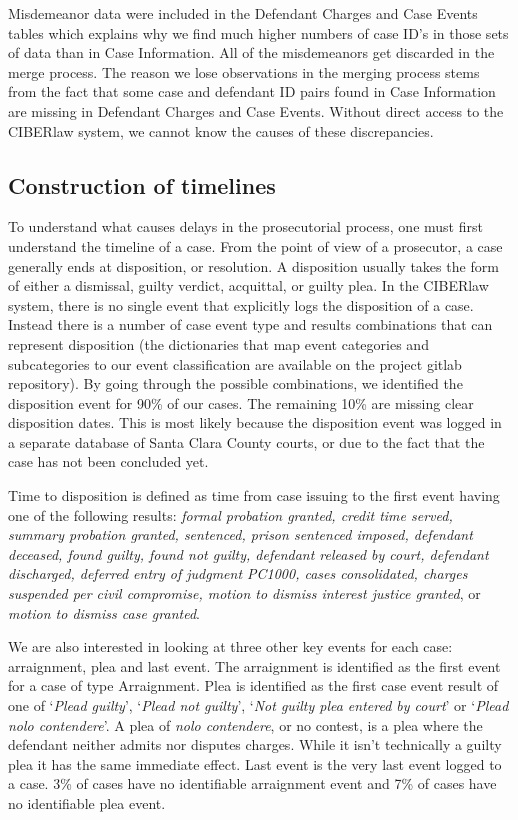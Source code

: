 \documentclass{AISB2008}
\begin{document}
Misdemeanor data were included in the Defendant Charges and Case Events
tables which explains why we find much higher numbers of case ID's in
those sets of data than in Case Information. All of the misdemeanors get
discarded in the merge process. The reason we lose observations in the
merging process stems from the fact that some case and defendant ID
pairs found in Case Information are missing in Defendant Charges and
Case Events. Without direct access to the CIBERlaw system, we cannot
know the causes of these discrepancies.

\subsection{Construction of timelines}\label{construction-of-timelines}

To understand what causes delays in the prosecutorial process, one must
first understand the timeline of a case. From the point of view of a
prosecutor, a case generally ends at disposition, or resolution. A
disposition usually takes the form of either a dismissal, guilty
verdict, acquittal, or guilty plea. In the CIBERlaw system, there is no
single event that explicitly logs the disposition of a case. Instead
there is a number of case event type and results combinations that can
represent disposition (the dictionaries that map event categories and
subcategories to our event classification are available on the project
gitlab repository). By going through the possible combinations, we
identified the disposition event for 90\% of our cases. The remaining
10\% are missing clear disposition dates. This is most likely because
the disposition event was logged in a separate database of Santa Clara
County courts, or due to the fact that the case has not been concluded
yet.

Time to disposition is defined as time from case issuing to the first
event having one of the following results: \emph{formal probation
granted, credit time served, summary probation granted, sentenced,
prison sentenced imposed, defendant deceased, found guilty, found not
guilty, defendant released by court, defendant discharged, deferred
entry of judgment PC1000, cases consolidated, charges suspended per
civil compromise, motion to dismiss interest justice granted}, or
\emph{motion to dismiss case granted}.

We are also interested in looking at three other key events for each
case: arraignment, plea and last event. The arraignment is identified as
the first event for a case of type Arraignment. Plea is identified as
the first case event result of one of `\emph{Plead guilty}',
`\emph{Plead not guilty}', `\emph{Not guilty plea entered by court}' or
`\emph{Plead nolo contendere}'. A plea of \emph{nolo contendere}, or no
contest, is a plea where the defendant neither admits nor disputes
charges. While it isn't technically a guilty plea it has the same
immediate effect. Last event is the very last event logged to a case.
3\% of cases have no identifiable arraignment event and 7\% of cases
have no identifiable plea event.
\end{document}
